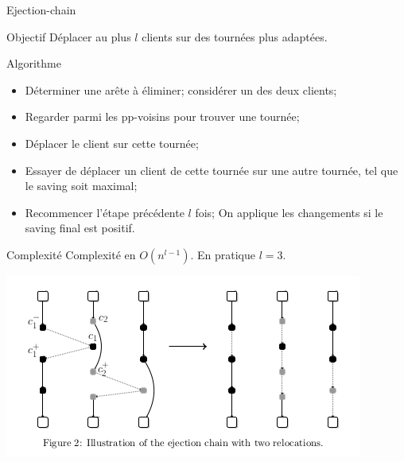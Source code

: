 \documentclass{beamer}
\begin{document}
\begin{frame}{Ejection-chain}

\begin{block}{Objectif}
Déplacer au plus $l$ clients sur des tournées plus adaptées. 
\end{block}

\begin{exampleblock}{Algorithme}
\begin{itemize}
\item Déterminer une arête à éliminer; considérer un des deux clients;
\item Regarder parmi les pp-voisins pour trouver une tournée;
\item Déplacer le client sur cette tournée;
\item Essayer de déplacer un client de cette tournée sur une autre tournée, tel que le saving soit maximal;
\item Recommencer l'étape précédente $l$ fois; On applique les changements si le saving final est positif.
\end{itemize}
\end{exampleblock}

\end{frame}

\begin{frame}

\begin{alertblock}{Complexité}
Complexité en $O(n^{l-1})$. En pratique $l=3$. 
\end{alertblock}

	\centering
	\includegraphics[height=0.4\textheight]{ejection_chain.png}
\end{frame}
\end{document}
